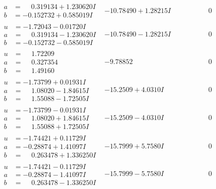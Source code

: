 \documentclass[1p]{elsarticle_modified}
\theoremstyle{definition}
\begin{document}
$$\begin{array}{c|c|c}
\begin{aligned}
a &= \phantom{-}0.319134 + 1.230620 I \\
b &= -0.152732 + 0.585019 I\end{aligned}
 & -10.78490 + 1.28215 I & \phantom{-0.000000 } 0 \\ \hline\begin{aligned}
u &= -1.72043 - 0.01720 I \\
a &= \phantom{-}0.319134 - 1.230620 I \\
b &= -0.152732 - 0.585019 I\end{aligned}
 & -10.78490 - 1.28215 I & \phantom{-0.000000 } 0 \\ \hline\begin{aligned}
u &= \phantom{-}1.72209\phantom{ +0.000000I} \\
a &= \phantom{-}0.327354\phantom{ +0.000000I} \\
b &= \phantom{-}1.49160\phantom{ +0.000000I}\end{aligned}
 & -9.78852\phantom{ +0.000000I} & \phantom{-0.000000 } 0 \\ \hline\begin{aligned}
u &= -1.73799 + 0.01931 I \\
a &= \phantom{-}1.08020 - 1.84615 I \\
b &= \phantom{-}1.55088 - 1.72505 I\end{aligned}
 & -15.2509 + 4.0310 I & \phantom{-0.000000 } 0 \\ \hline\begin{aligned}
u &= -1.73799 - 0.01931 I \\
a &= \phantom{-}1.08020 + 1.84615 I \\
b &= \phantom{-}1.55088 + 1.72505 I\end{aligned}
 & -15.2509 - 4.0310 I & \phantom{-0.000000 } 0 \\ \hline\begin{aligned}
u &= -1.74421 + 0.11729 I \\
a &= -0.28874 + 1.41097 I \\
b &= \phantom{-}0.263478 + 1.336250 I\end{aligned}
 & -15.7999 + 5.7580 I & \phantom{-0.000000 } 0 \\ \hline\begin{aligned}
u &= -1.74421 - 0.11729 I \\
a &= -0.28874 - 1.41097 I \\
b &= \phantom{-}0.263478 - 1.336250 I\end{aligned}
 & -15.7999 - 5.7580 I & \phantom{-0.000000 } 0 \\ \hline\begin{aligned}

\end{aligned}
\end{array}$$
\end{document}
